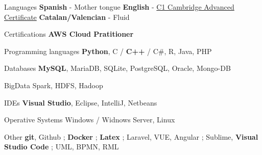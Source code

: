 

\begin{cvskills}
  \cvskill
    {Languages} %
    {\textbf{Spanish} - Mother tongue \acvHeaderSocialSep \textbf{English} - \href{https://bit.ly/48MClKA}{C1 Cambridge Advanced Certificate}  \acvHeaderSocialSep \textbf{Catalan/Valencian} - Fluid}
    
	\cvskill
	    {Certifications} %
	    {\textbf{AWS Cloud Pratitioner}} %
    
  \cvskill
	{Programming languages} %
	{\textbf{Python},  C / \textbf{C++} / C\#,  R,  Java,  PHP} %
	
  \cvskill
	{Databases} %
	{\textbf{MySQL},  MariaDB,  SQLite,  PostgreSQL,  Oracle,  Mongo-DB} %
	
  \cvskill
	{BigData} %
	{Spark, HDFS, Hadoop} %
	
  \cvskill
	{IDEs} %
	{\textbf{Visual Studio},  Eclipse,  IntelliJ,  Netbeans} %
 
  \cvskill
	{Operative Systems} %
	{Windows / Widnows Server,  Linux} %
 
  \cvskill
	{Other} %
	{\textbf{git}, Github ; \textbf{Docker} ; \textbf{Latex} ;  Laravel, VUE, Angular ; Sublime, \textbf{Visual Studio Code} ; UML,  BPMN,  RML} %
\end{cvskills}

